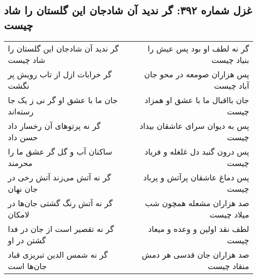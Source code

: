 \begin{center}
\section*{غزل شماره ۳۹۲: گر ندید آن شادجان این گلستان را شاد چیست}
\label{sec:0392}
\begin{longtable}{l p{0.5cm} r}
گر ندید آن شادجان این گلستان را شاد چیست
&&
گر نه لطف او بود پس عیش را بنیاد چیست
\\
گر خرابات ازل از تاب رویش پر نگشت
&&
پس هزاران صومعه در محو جان آباد چیست
\\
جان ما با عشق او گر نی ز یک جا رسته‌اند
&&
جان بااقبال ما با عشق او همزاد چیست
\\
گر نه پرتوهای آن رخسار داد حسن داد
&&
پس به دیوان سرای عاشقان بیداد چیست
\\
ساکنان آب و گل گر عشق ما را محرمند
&&
پس درون گنبد دل غلغله و فریاد چیست
\\
گر نه آتش می‌زند آتش رخی در جان نهان
&&
پس دماغ عاشقان پرآتش و پرباد چیست
\\
گر نه آتش رنگ گشتی جان‌ها در لامکان
&&
صد هزاران مشعله همچون شب میلاد چیست
\\
گر نه تقصیر است از جان در فدا گشتن در او
&&
لطف نقد اولین و وعده و میعاد چیست
\\
گر نه شمس الدین تبریزی قباد جان‌ها است
&&
صد هزاران جان قدسی هر دمش منقاد چیست
\\
\end{longtable}
\end{center}

